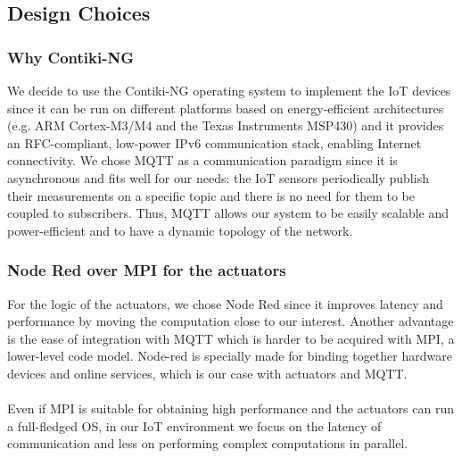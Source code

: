 \documentclass{article}
\begin{document}
\subsection{Design Choices}
\subsubsection{Why Contiki-NG}
We decide to use the Contiki-NG operating system to implement the IoT devices since it can be run on different platforms based on energy-efficient architectures (e.g. ARM Cortex-M3/M4 and the Texas Instruments MSP430) and it provides an RFC-compliant, low-power IPv6 communication stack, enabling Internet connectivity.
\linebreak
\linebreak
We chose MQTT as a communication paradigm since it is asynchronous and fits well for our needs: the IoT sensors periodically publish their measurements on a specific topic and there is no need for them to be coupled to subscribers. Thus, MQTT allows our system to be easily scalable and power-efficient and to have a dynamic topology of the network.

  
\subsubsection{Node Red over MPI for the actuators}
For the logic of the actuators, we chose Node Red since it improves latency and performance by moving the computation close to our interest. Another advantage is the ease of integration with MQTT which is harder to be acquired with MPI, a lower-level code model. Node-red is specially made for binding together hardware devices and online services, which is our case with actuators and MQTT. 
\\
\\
Even if MPI is suitable for obtaining high performance and the actuators can run a full-fledged OS, in our IoT environment we focus on the latency of communication and less on performing complex computations in parallel. 
\end{document}
